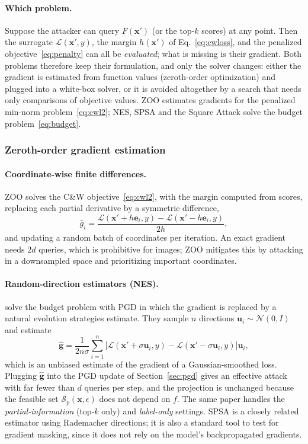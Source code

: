 \documentclass[10pt,a4paper]{extarticle}
\theoremstyle{definition}
\newcommand{\Loss}{\mathcal{L}}
\newcommand{\x}{\mathbf{x}}
\newcommand{\xadv}{\mathbf{x}'}
\begin{document}
\paragraph{Which problem.} Suppose the attacker can query \(F(\xadv)\) (or the top-\(k\) scores) at any point. Then the surrogate \(\Loss(\xadv,y)\), the margin \(h(\xadv)\) of Eq.~\eqref{eq:cwloss}, and the penalized objective~\eqref{eq:penalty} can all be \emph{evaluated}; what is missing is their gradient. Both problems therefore keep their formulation, and only the solver changes: either the gradient is estimated from function values (zeroth-order optimization) and plugged into a white-box solver, or it is avoided altogether by a search that needs only comparisons of objective values. ZOO estimates gradients for the penalized min-norm problem~\eqref{eq:cwl2}; NES, SPSA and the Square Attack solve the budget problem~\eqref{eq:budget}.

\subsubsection{Zeroth-order gradient estimation}

\paragraph{Coordinate-wise finite differences.} ZOO \citep{chen2017zoo} solves the C\&W objective~\eqref{eq:cwl2}, with the margin computed from scores, replacing each partial derivative by a symmetric difference,
\[
\hat g_i = \frac{\Loss(\xadv+h\mathbf{e}_i,y)-\Loss(\xadv-h\mathbf{e}_i,y)}{2h},
\]
and updating a random batch of coordinates per iteration. An exact gradient needs \(2d\) queries, which is prohibitive for images; ZOO mitigates this by attacking in a downsampled space and prioritizing important coordinates.

\paragraph{Random-direction estimators (NES).} \citet{ilyas2018blackbox} solve the budget problem with PGD in which the gradient is replaced by a natural evolution strategies estimate. They sample \(n\) directions \(\mathbf{u}_i\sim\mathcal{N}(0,I)\) and estimate
\begin{equation}\label{eq:nes}
\hat{\mathbf{g}} = \frac{1}{2n\sigma}\sum_{i=1}^{n}\big[\Loss(\xadv+\sigma\mathbf{u}_i,y)-\Loss(\xadv-\sigma\mathbf{u}_i,y)\big]\mathbf{u}_i,
\end{equation}
which is an unbiased estimate of the gradient of a Gaussian-smoothed loss. Plugging \(\hat{\mathbf{g}}\) into the PGD update of Section~\ref{sec:pgd} gives an effective attack with far fewer than \(d\) queries per step, and the projection is unchanged because the feasible set \(\mathcal{S}_p(\x,\epsilon)\) does not depend on \(f\). The same paper handles the \emph{partial-information} (top-\(k\) only) and \emph{label-only} settings. SPSA \citep{uesato2018adversarial} is a closely related estimator using Rademacher directions; it is also a standard tool to test for gradient masking, since it does not rely on the model's backpropagated gradients.
\end{document}
